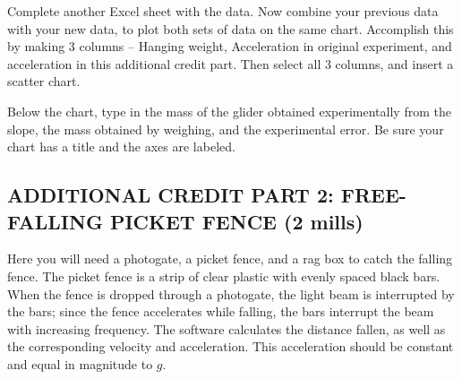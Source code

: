 \documentclass{article}
\begin{document}
Complete another Excel sheet with the data.
Now combine your previous data with your new data, to plot both sets of data on
the same chart.
Accomplish this by making 3 columns -- Hanging weight, Acceleration in original
experiment, and acceleration in this additional credit part.
Then select all 3 columns, and insert a scatter chart.

Below the chart, type in the mass of the glider obtained experimentally from the slope, the mass obtained by weighing, and the experimental error.  
Be sure your chart has a title and the axes are labeled.


\begin{comment}
\subsection*{ADDITIONAL CREDIT PART 2: DIFFERENT METHODS OF STARTING THE GLIDER (2 mills)}

When the air pump is first turned on, there may be some friction between the track and the glider, since it takes a few moments for the pressure to reach its maximum value.  Try several runs in which the glider is released a few seconds after the maximum air pressure has been attained, and several runs in which air causes the glider to ``float'' up the track before it begins to accelerate downward.  Is there any systematic difference in the data obtained from the two methods?  Which method produces results that agree more closely with Newton's Second Law?  Explain what you are doing, and record your measurements and conclusions.
\end{comment}

\subsection*{ADDITIONAL CREDIT PART 2: FREE-FALLING PICKET FENCE \bf{(2 mills)}}

Here you will need a photogate, a picket fence, and a rag box to catch the falling fence.  The picket fence is a strip of clear plastic with evenly spaced black bars.  When the fence is dropped through a photogate, the light beam is interrupted by the bars; since the fence accelerates while falling, the bars interrupt the beam with increasing frequency.  The software calculates the distance fallen, as well as the corresponding velocity and acceleration.  This acceleration should be constant and equal in magnitude to \(g\).

\end{document}
